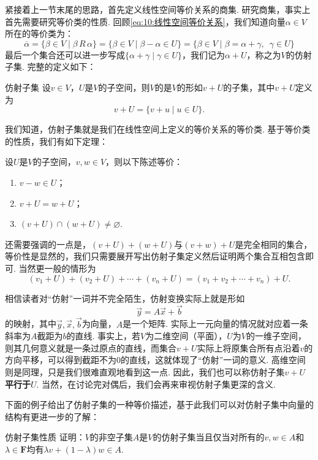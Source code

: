 紧接着上一节末尾的思路，首先定义线性空间等价关系的商集. 研究商集，事实上首先需要研究等价类的性质. 回顾\autoref{eq:10:线性空间等价关系}，我们知道向量$\alpha\in V$所在的等价类为：
\[\overline{\alpha}=\{\beta\in V \mid \beta\,R\,\alpha\}=\{\beta\in V \mid \beta-\alpha\in U\}=\{\beta\in V \mid \beta=\alpha+\gamma,\enspace\gamma\in U\}\]
最后一个集合还可以进一步写成$\{\alpha+\gamma \mid \gamma\in U\}$，我们记为$\alpha+U$，称之为$V$的仿射子集. 完整的定义如下：
\begin{definition}{仿射子集}{} 
    设$v\in V$，$U$是$V$的子空间，则$V$的是$V$的形如$v+U$的子集，其中$v+U$定义为
    \[v+U=\{v+u \mid u\in U\}.\]
\end{definition}
我们知道，仿射子集就是我们在线性空间上定义的等价关系的等价类. 基于等价类的性质，我们有如下定理：
\begin{theorem}{}{}
    设$U$是$V$的子空间，$v,w\in V$，则以下陈述等价：
    \begin{enumerate}
        \item $v-w\in U$；
        \item $v+U=w+U$；
        \item $(v+U)\cap(w+U)\neq \varnothing$.
    \end{enumerate}
\end{theorem}

还需要强调的一点是，$(v+U)+(w+U)$与$(v+w)+U$是完全相同的集合，等价性是显然的，我们只需要展开写出仿射子集定义然后证明两个集合互相包含即可. 当然更一般的情形为
\[(v_1+U)+(v_2+U)+\cdots+(v_n+U)=(v_1+v_2+\cdots+v_n)+U.\]

相信读者对``仿射''一词并不完全陌生，仿射变换实际上就是形如\[\vec{y}=A\vec{x}+\vec{b}\]的映射，其中$\vec{y},\vec{x},\vec{b}$为向量，$A$是一个矩阵. 实际上一元向量的情况就对应着一条斜率为$A$截距为$b$的直线. 事实上，若$V$为二维空间（平面），$U$为$V$的一维子空间，则其几何意义就是一条过原点的直线，而集合$v+U$实际上将原集合所有点沿着$v$的方向平移，可以得到截距不为0的直线，这就体现了``仿射''一词的意义. 高维空间则是同理，只是我们很难直观地看到这一点. 因此，我们也可以称仿射子集$v+U$\textbf{\heiti 平行于}$U$. 当然，在讨论完对偶后，我们会再来审视仿射子集更深的含义.

下面的例子给出了仿射子集的一种等价描述，基于此我们可以对仿射子集中向量的结构有更进一步的了解：
\begin{example}{}{仿射子集性质}
    证明：$V$的非空子集$A$是$V$的仿射子集当且仅当对所有的$v,w\in A$和$\lambda\in\mathbf{F}$均有$\lambda v+(1-\lambda)w\in A$.
\end{example}

